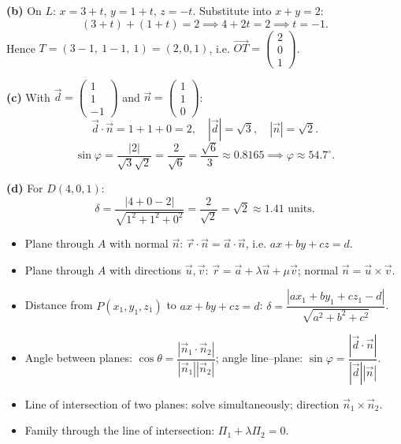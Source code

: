 \documentclass[11pt]{article}
\begin{document}
\begin{exoresolu}
\textbf{(b)} On $L$: $x = 3+t$, $y = 1+t$, $z = -t$. Substitute into $x + y = 2$:
\[ (3+t) + (1+t) = 2 \implies 4 + 2t = 2 \implies t = -1. \]
Hence $T = (3-1,\ 1-1,\ 1) = (2, 0, 1)$, i.e. $\vec{OT} = \begin{pmatrix} 2 \\ 0 \\ 1 \end{pmatrix}$.

\textbf{(c)} With $\vec{d} = \begin{pmatrix} 1 \\ 1 \\ -1 \end{pmatrix}$ and $\vec{n} = \begin{pmatrix} 1 \\ 1 \\ 0 \end{pmatrix}$:
\[ \vec{d}\cdot\vec{n} = 1 + 1 + 0 = 2, \quad |\vec{d}| = \sqrt{3}, \quad |\vec{n}| = \sqrt{2}. \]
\[ \sin\varphi = \frac{|2|}{\sqrt{3}\sqrt{2}} = \frac{2}{\sqrt{6}} = \frac{\sqrt{6}}{3} \approx 0.8165 \implies \varphi \approx 54.7^{\circ}. \]

\textbf{(d)} For $D(4, 0, 1)$:
\[ \delta = \frac{|4 + 0 - 2|}{\sqrt{1^2 + 1^2 + 0^2}} = \frac{2}{\sqrt{2}} = \sqrt{2} \approx 1.41 \text{ units}. \]
\end{exoresolu}

\begin{aretenir}
\begin{itemize}
\item Plane through $A$ with normal $\vec{n}$: $\vec{r}\cdot\vec{n} = \vec{a}\cdot\vec{n}$, i.e. $ax+by+cz=d$.
\item Plane through $A$ with directions $\vec{u}, \vec{v}$: $\vec{r} = \vec{a} + \lambda\vec{u} + \mu\vec{v}$; normal $\vec{n} = \vec{u}\times\vec{v}$.
\item Distance from $P(x_1,y_1,z_1)$ to $ax+by+cz=d$: $\delta = \dfrac{|ax_1+by_1+cz_1-d|}{\sqrt{a^2+b^2+c^2}}$.
\item Angle between planes: $\cos\theta = \dfrac{|\vec{n}_1\cdot\vec{n}_2|}{|\vec{n}_1||\vec{n}_2|}$; angle line--plane: $\sin\varphi = \dfrac{|\vec{d}\cdot\vec{n}|}{|\vec{d}||\vec{n}|}$.
\item Line of intersection of two planes: solve simultaneously; direction $\vec{n}_1\times\vec{n}_2$.
\item Family through the line of intersection: $\Pi_1 + \lambda\Pi_2 = 0$.
\end{itemize}
\end{aretenir}
\end{document}
